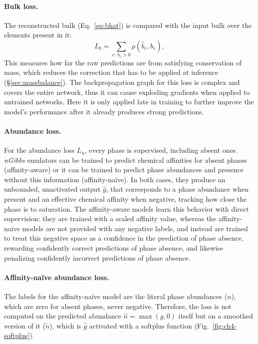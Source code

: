 \paragraph{Bulk loss.}
The reconstructed bulk (Eq.~\ref{eq:bhat}) is compared with the input bulk over the elements present in it:
\begin{equation}
  L_b = \sum_{e:\, b_e > 0} \rho(\hat b_e, b_e),
\end{equation}
This measures how far the raw predictions are from satisfying conservation of mass, which reduces
the correction that has to be applied at inference (\S\ref{sec:massbalance}). The backpropagation graph for this loss is complex
and covers the entire network, thus it can cause exploding gradients when applied to untrained networks. Here it is only applied late in training 
to further improve the model's performance after it already produces strong predictions.

\paragraph{Abundance loss.} For the abundance loss $L_n$, every phase is supervised, including absent ones. \emph{nGibbs} emulators can be trained 
to predict chemical affinities for absent phases (affinity-aware) or it can be trained to predict phase abundances and presence 
without this information (affinity-na\"{i}ve). In both cases, they produce an unbounded, unactivated output $\hat g$, that corresponds to a phase abundance when present and 
an effective chemical affinity when negative, tracking how close the phase is to saturation. The affinity-aware models learn this behavior with direct 
supervision: they are trained with a scaled affinity value, whereas the affinity-naive models are not provided with any negative labels, and instead are 
trained to treat this negative space as a confidence in the prediction of phase absence, rewarding confidently correct predictions of phase absence, 
and likewise penalizing confidently incorrect predictions of phase absence.

\paragraph{Affinity-na\"{i}ve abundance loss.} The labels for the affinity-na\"{i}ve model are the literal phase abundances ($n$), which are zero for absent phases, 
never negative. Therefore, the loss is not computed on the predicted abundance $\hat n = \max(g, 0)$ itself but on a smoothed version of it ($\tilde n$), which is $\hat g$ 
activated with a softplus function (Fig.~\ref{fig:ch4-softplus}).

